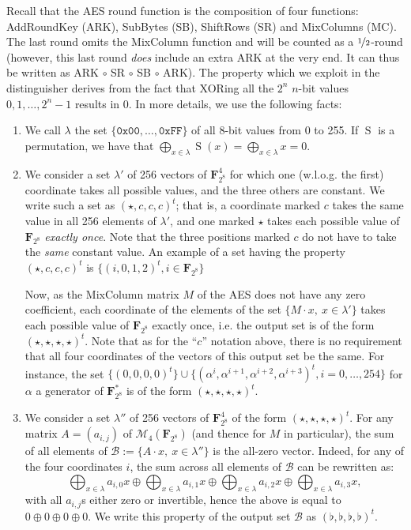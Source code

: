 \documentclass[a4paper,11pt]{article}
\DeclareMathOperator\sub{S}
\newcommand\mc{M}
\begin{document}
Recall that the AES round function is the composition of four functions: AddRoundKey (ARK), SubBytes (SB), ShiftRows (SR) and MixColumns (MC).
The last round omits the
MixColumn function and will be counted as a $\nicefrac{1}{2}$-round (however, this last round \emph{does} include an extra ARK at the very end.
It can thus be written as ARK $\circ$ SR $\circ$ SB $\circ$ ARK).
The property which we exploit in the distinguisher derives from the fact that XORing all the $2^n$ $n$-bit values $0, 1, \ldots, 2^{n}-1$ results in $0$. 
In more details, we use the following facts:
\begin{enumerate}
\item We call $\lambda$ the set $\{\texttt{0x00}, \ldots, \texttt{0xFF}\}$ of all 8-bit values from 0 to 255.
If $\sub$ is a permutation, we have that $\bigoplus_{x \in \lambda} \sub(x) = \bigoplus_{x \in \lambda} x = 0$.
\item We consider a set $\lambda'$ of 256 vectors of $\mathbf{F}_{2^8}^4$ for which one (w.l.o.g. the first) coordinate takes all possible values,
and the three others are constant. We write such a set as $(\star, c, c, c)^t$; that is, a coordinate marked $c$ takes the same value in all 256 elements
of $\lambda'$, and one marked $\star$ takes each possible value of $\mathbf{F}_{2^8}$ \emph{exactly once}. Note that the three positions marked $c$
do not have to take the \emph{same} constant value.
An example of a set having the property $(\star, c, c, c)^t$ is $\{(i, 0, 1, 2)^t, i \in \mathbf{F}_{2^8}\}$ 

Now, as the MixColumn matrix $\mc$ of the AES
does not have any zero coefficient, each coordinate of the elements of the set $\{\mc\cdot x,~x \in \lambda'\}$ takes each possible value
of $\mathbf{F}_{2^8}$ exactly once, 
i.e. the output set is of the form $(\star, \star, \star, \star)^t$.
Note that as for the ``$c$'' notation above, there is no requirement that all four coordinates of the vectors of this output set be the same.
For instance, the set $\{(0, 0, 0, 0)^t\} \cup \{(\alpha^i, \alpha^{i+1}, \alpha^{i+2}, \alpha^{i+3})^t, i = 0,\ldots,254\}$ for $\alpha$
a generator of $\mathbf{F}_{2^8}^*$ is of the form $(\star, \star, \star, \star)^t$. 


\item We consider a set $\lambda''$ of 256 vectors of $\mathbf{F}_{2^8}^4$ of the form $(\star, \star, \star, \star)^t$. For any matrix
$A = (a_{i,j})$ of $\mathcal{M}_{4}(\mathbf{F}_{2^8})$ (and thence for $\mc$ in particular), the sum of all elements of $\mathcal{B} := \{A\cdot x,~x \in \lambda''\}$
is the all-zero vector. Indeed, for any of the four coordinates $i$, the sum across all elements of $\mathcal{B}$ can be rewritten as:
\[
\bigoplus_{x \in \lambda} a_{i,0} x \oplus \bigoplus_{x \in \lambda} a_{i,1} x \oplus \bigoplus_{x \in \lambda} a_{i,2} x \oplus \bigoplus_{x \in \lambda} a_{i,3} x,
\]
with all $a_{i,j}$s either zero or invertible, hence the above is equal to $0 \oplus 0 \oplus 0 \oplus 0$. We write this property of the output
set $\mathcal{B}$ as $(\flat, \flat, \flat, \flat)^t$.
\end{enumerate}
\end{document}
